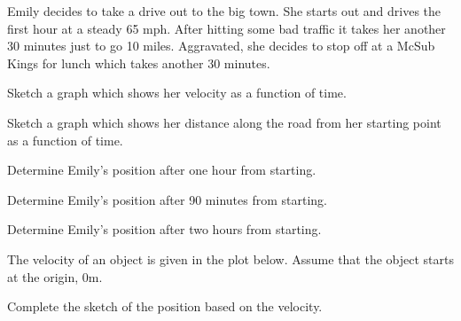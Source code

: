 \begin{problem}
\item Emily decides to take a drive out to the big town. She starts
  out and drives the first hour at a steady 65 mph. After hitting some
  bad traffic it takes her another 30 minutes just to go 10
  miles. Aggravated, she decides to stop off at a McSub Kings for
  lunch which takes another 30 minutes. 


  \begin{subproblem}
    \item Sketch a graph which shows her velocity as a function of
      time.


      \vfill

  \item Sketch a graph which shows her distance along the road from
    her starting point as a function of time.  


    \vfill

    \item Determine Emily's position after one hour from starting.
      \vspace{3em}

    \item Determine Emily's position after 90 minutes from starting.
      \vspace{3em}

    \item Determine Emily's position after two hours from starting.
      \vspace{3em}


  \end{subproblem}


  \clearpage

\item The velocity of an object is given in the plot below.  Assume
  that the object starts at the origin, 0m.

  \begin{subproblem}
  \item Complete the sketch of the position based on the velocity.

    \scalebox{0.8}{}


\end{subproblem}
\end{problem}
